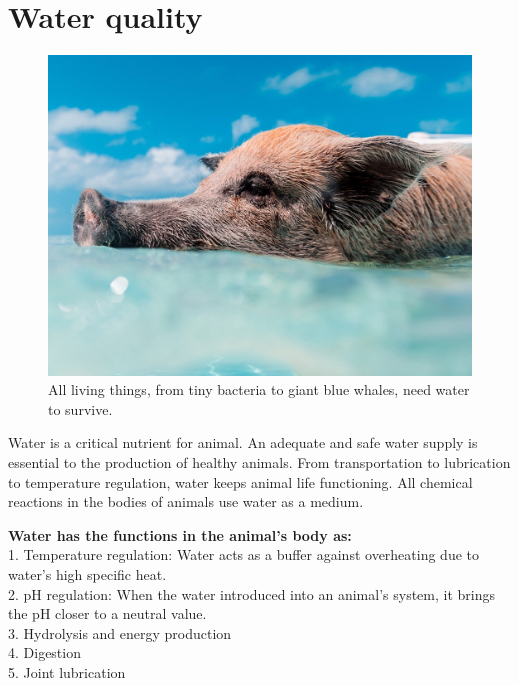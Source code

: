 \documentclass[]{book}
\begin{document}
\hypertarget{water-quality}{%
\chapter{Water quality}\label{water-quality}}

\begin{figure}

{\centering \includegraphics[width=1\linewidth,height=1\textheight]{figures/water-pig} 

}

\caption{All living things, from tiny bacteria to giant blue whales, need water to survive.}\label{fig:water-pig}
\end{figure}

Water is a critical nutrient for animal. An adequate and safe water supply is essential to the production of healthy animals. From transportation to lubrication to temperature regulation, water keeps animal life functioning. All chemical reactions in the bodies of animals use water as a medium.

\textbf{Water has the functions in the animal's body as:}\\
1. Temperature regulation: Water acts as a buffer against overheating due to water's high specific heat.\\
2. pH regulation: When the water introduced into an animal's system, it brings the pH closer to a neutral value.\\
3. Hydrolysis and energy production\\
4. Digestion\\
5. Joint lubrication
\end{document}
